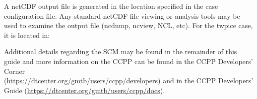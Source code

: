 
A netCDF output file is generated in the location specified in the case
configuration file. Any standard netCDF file viewing or analysis tools may be used to 
examine the output file (ncdump, ncview, NCL, etc).  For the twpice case, it is located in:


Additional details regarding the SCM may be found in the remainder of this guide and more information on the CCPP can be found in the CCPP Developers' Corner\\ (\url{https://dtcenter.org/gmtb/users/ccpp/developers}) and in the CCPP Developers' Guide (\url{https://dtcenter.org/gmtb/users/ccpp/docs}).







